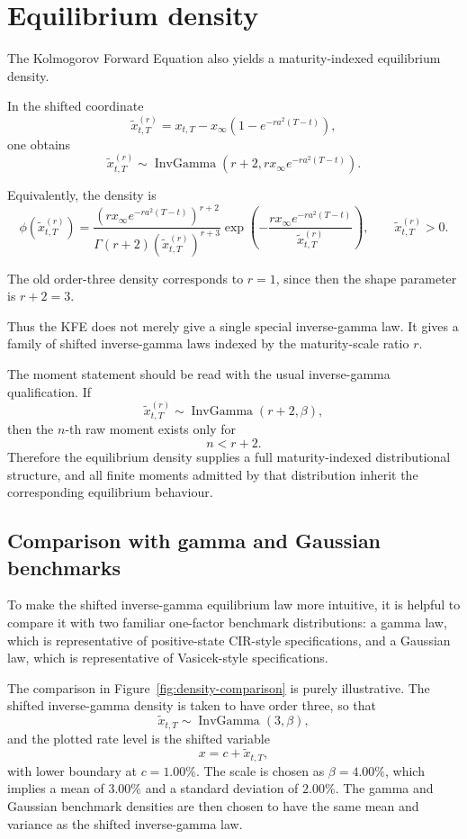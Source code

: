 \documentclass[11pt]{article}
\theoremstyle{plainbreak}
\begin{document}
\section{Equilibrium density}

The Kolmogorov Forward Equation also yields a maturity-indexed equilibrium density.

In the shifted coordinate
\[
\widetilde{x}^{(r)}_{t,T}
=
x_{t,T}
-
x_\infty\left(1-e^{-ra^2(T-t)}\right),
\]
one obtains
\[
\widetilde{x}^{(r)}_{t,T}
\sim
\operatorname{InvGamma}
\left(
r+2,
rx_\infty e^{-ra^2(T-t)}
\right).
\]

Equivalently, the density is
\[
\phi(\widetilde{x}^{(r)}_{t,T})
=
\frac{
\left(rx_\infty e^{-ra^2(T-t)}\right)^{r+2}
}{
\Gamma(r+2)
\left(\widetilde{x}^{(r)}_{t,T}\right)^{r+3}
}
\exp\left(
-
\frac{rx_\infty e^{-ra^2(T-t)}}{\widetilde{x}^{(r)}_{t,T}}
\right),
\qquad \widetilde{x}^{(r)}_{t,T}>0.
\]

The old order-three density corresponds to \(r=1\), since then the shape parameter is \(r+2=3\).

Thus the KFE does not merely give a single special inverse-gamma law. It gives a family of shifted inverse-gamma laws indexed by the maturity-scale ratio \(r\).

The moment statement should be read with the usual inverse-gamma qualification. If
\[
\widetilde{x}^{(r)}_{t,T}\sim \operatorname{InvGamma}(r+2,\beta),
\]
then the \(n\)-th raw moment exists only for
\[
n<r+2.
\]
Therefore the equilibrium density supplies a full maturity-indexed distributional structure, and all finite moments admitted by that distribution inherit the corresponding equilibrium behaviour.

\subsection{Comparison with gamma and Gaussian benchmarks}

To make the shifted inverse-gamma equilibrium law more intuitive, it is helpful to compare it with two familiar one-factor benchmark distributions: a gamma law, which is representative of positive-state CIR-style specifications, and a Gaussian law, which is representative of Vasicek-style specifications.

The comparison in Figure~\ref{fig:density-comparison} is purely illustrative. The shifted inverse-gamma density is taken to have order three, so that
\[
\widetilde{x}_{t,T}\sim \operatorname{InvGamma}(3,\beta),
\]
and the plotted rate level is the shifted variable
\[
x = c + \widetilde{x}_{t,T},
\]
with lower boundary at \(c=1.00\%\). The scale is chosen as \(\beta=4.00\%\), which implies a mean of \(3.00\%\) and a standard deviation of \(2.00\%\). The gamma and Gaussian benchmark densities are then chosen to have the same mean and variance as the shifted inverse-gamma law.
\end{document}
